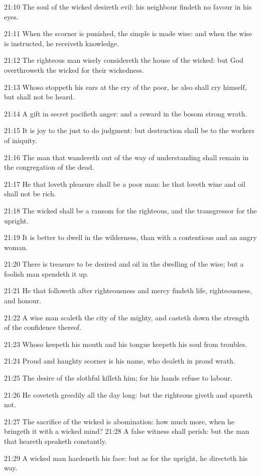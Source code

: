 21:10 The soul of the wicked desireth evil: his neighbour findeth no favour in his eyes.

21:11 When the scorner is punished, the simple is made wise: and when the wise is instructed, he receiveth knowledge.

21:12 The righteous man wisely considereth the house of the wicked: but God overthroweth the wicked for their wickedness.

21:13 Whoso stoppeth his ears at the cry of the poor, he also shall cry himself, but shall not be heard.

21:14 A gift in secret pacifieth anger: and a reward in the bosom strong wrath.

21:15 It is joy to the just to do judgment: but destruction shall be to the workers of iniquity.

21:16 The man that wandereth out of the way of understanding shall remain in the congregation of the dead.

21:17 He that loveth pleasure shall be a poor man: he that loveth wine and oil shall not be rich.

21:18 The wicked shall be a ransom for the righteous, and the transgressor for the upright.

21:19 It is better to dwell in the wilderness, than with a contentious and an angry woman.

21:20 There is treasure to be desired and oil in the dwelling of the wise; but a foolish man spendeth it up.

21:21 He that followeth after righteousness and mercy findeth life, righteousness, and honour.

21:22 A wise man scaleth the city of the mighty, and casteth down the strength of the confidence thereof.

21:23 Whoso keepeth his mouth and his tongue keepeth his soul from troubles.

21:24 Proud and haughty scorner is his name, who dealeth in proud wrath.

21:25 The desire of the slothful killeth him; for his hands refuse to labour.

21:26 He coveteth greedily all the day long: but the righteous giveth and spareth not.

21:27 The sacrifice of the wicked is abomination: how much more, when he bringeth it with a wicked mind?  21:28 A false witness shall perish: but the man that heareth speaketh constantly.

21:29 A wicked man hardeneth his face: but as for the upright, he directeth his way.

